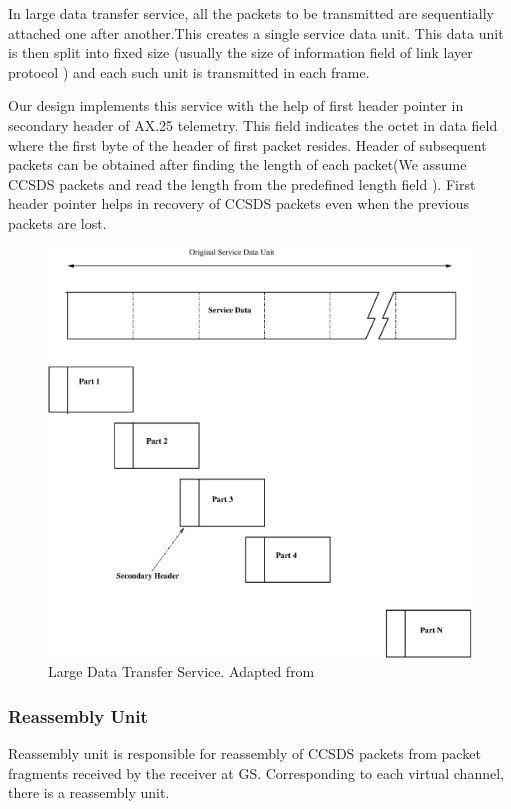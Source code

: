 \documentclass[BTech]{iitmdiss}
\begin{document}
\par In large data transfer service, all the packets to be transmitted are sequentially attached one after another.This creates a single service data unit. This data unit is then split into fixed size (usually the size of information field of link layer protocol ) and each such unit is transmitted in each frame. 
\par Our design implements this service with the help of first header pointer in secondary header of AX.25 telemetry. This field indicates the octet in data field where the first byte of the header of first packet resides. Header of subsequent packets can be obtained after finding the length of each packet(We assume CCSDS packets and read the length from the predefined length field ). First header pointer helps in recovery of CCSDS packets even when the previous packets are lost. 
\begin{figure}[H]
\includegraphics[scale = 0.5]{largedata.eps}
\caption{Large Data Transfer Service. Adapted from \citep{ecss}}
\label{fig:ldta}
\end{figure}
\subsubsection{Reassembly Unit}
Reassembly unit is responsible for reassembly of CCSDS packets from packet fragments received by the receiver at GS. Corresponding to each virtual channel, there is a reassembly unit. 
\end{document}
